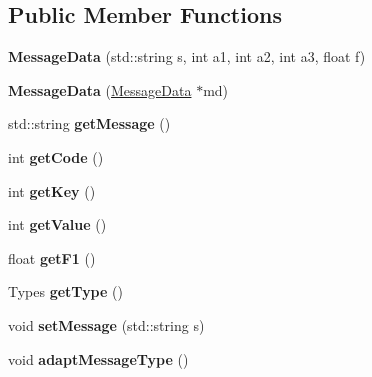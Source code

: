 \subsection*{Public Member Functions}
\begin{DoxyCompactItemize}
\item 
{\bfseries Message\+Data} (std\+::string s, int a1, int a2, int a3, float f)\hypertarget{classMessageData_af370333b9828ad63ba1031ac941300c2}{}\label{classMessageData_af370333b9828ad63ba1031ac941300c2}

\item 
{\bfseries Message\+Data} (\hyperlink{classMessageData}{Message\+Data} $\ast$md)\hypertarget{classMessageData_acf5694351e2f877340d6b38044d8b2d3}{}\label{classMessageData_acf5694351e2f877340d6b38044d8b2d3}

\item 
std\+::string {\bfseries get\+Message} ()\hypertarget{classMessageData_a8bf658a5be5789142fa260512fded9a1}{}\label{classMessageData_a8bf658a5be5789142fa260512fded9a1}

\item 
int {\bfseries get\+Code} ()\hypertarget{classMessageData_aa625a45bf78b8351d29a7696c8f014e9}{}\label{classMessageData_aa625a45bf78b8351d29a7696c8f014e9}

\item 
int {\bfseries get\+Key} ()\hypertarget{classMessageData_ab70773361a5ffba488a83b0d87cfb25c}{}\label{classMessageData_ab70773361a5ffba488a83b0d87cfb25c}

\item 
int {\bfseries get\+Value} ()\hypertarget{classMessageData_af79bf248fbb542bd25984f7f2b3993eb}{}\label{classMessageData_af79bf248fbb542bd25984f7f2b3993eb}

\item 
float {\bfseries get\+F1} ()\hypertarget{classMessageData_ad1e951e980e59c5d222b79856cae6d32}{}\label{classMessageData_ad1e951e980e59c5d222b79856cae6d32}

\item 
Types {\bfseries get\+Type} ()\hypertarget{classMessageData_a38c69b7ebcf46e7c19ff2409af36a7ae}{}\label{classMessageData_a38c69b7ebcf46e7c19ff2409af36a7ae}

\item 
void {\bfseries set\+Message} (std\+::string s)\hypertarget{classMessageData_a1da8f45a1453c7d11029fa360d7a642c}{}\label{classMessageData_a1da8f45a1453c7d11029fa360d7a642c}

\item 
void {\bfseries adapt\+Message\+Type} ()\hypertarget{classMessageData_a0f8ce5f6d5c4452e26656236ee7aefc3}{}\label{classMessageData_a0f8ce5f6d5c4452e26656236ee7aefc3}


\end{DoxyCompactItemize}
